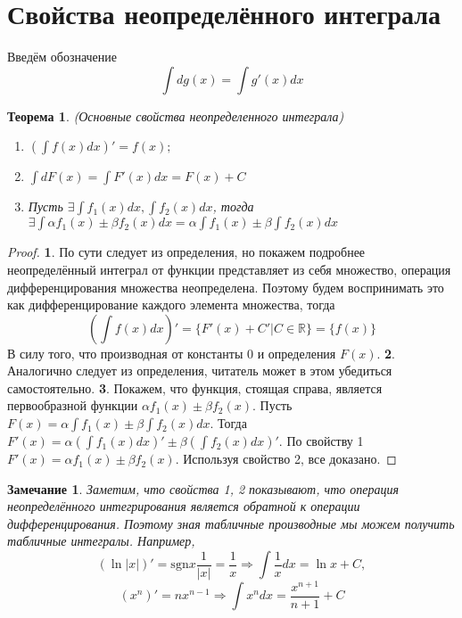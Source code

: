 \documentclass{book} %
\newtheorem{theorem}{Теорема}[chapter] %
\newtheorem{notabene}{Замечание}[chapter]
\theoremstyle{definition}
\theoremstyle{remark}
\begin{document}
	\section{Свойства неопределённого интеграла}
		Введём обозначение
		$$
		\int d g(x) = \int g'(x) dx
		$$
		\begin{theorem}
			(Основные свойства неопределенного интеграла)\newline
			\begin{enumerate}
				\item $\left(\int f(x) dx\right)' = f(x);$
				\item $\int d F(x) = \int F'(x) dx = F(x) + C$
				\item Пусть $\exists \int f_1(x) dx, \int f_2(x) dx$, тогда  $\exists \int \alpha f_1(x) \pm \beta f_2(x) dx = \alpha \int f_1(x) \pm \beta \int f_2(x) dx$
			\end{enumerate}
		\end{theorem}
		\begin{proof}
			\textbf{1}. По сути следует из определения, но покажем подробнее
			неопределённый интеграл от функции представляет из себя множество, операция дифференцирования множества неопределена. Поэтому будем воспринимать это как дифференцирование каждого элемента множества, тогда 
			$$\left(\int f(x) dx \right)' = \{F'(x) + C' \vert C \in \mathbb{R}\} = \{f(x) \}$$
			В силу того, что производная от константы 0 и определения $F(x)$.\newline
			\textbf{2}. Аналогично следует из определения, читатель может в этом убедиться самостоятельно.\newline
			\textbf{3}. Покажем, что функция, стоящая справа, является первообразной функции $\alpha f_1(x) \pm \beta f_2(x)$.\newline
			Пусть $F(x) = \alpha \int f_1(x) \pm \beta \int f_2(x) dx$. Тогда $F'(x) = \alpha \left(\int f_1(x) dx\right)' \pm \beta \left(\int f_2(x) dx\right)'$. По свойству 1 $F'(x) = \alpha f_1(x) \pm \beta f_2(x)$. Используя свойство 2, все доказано.
		\end{proof}
		\begin{notabene}
			Заметим, что свойства 1, 2 показывают, что операция неопределённого интегрирования является обратной к операции дифференцирования. Поэтому зная табличные производные мы можем получить табличные интегралы. Например, 
			$$
				\left(\ln{|x|}\right)' = \mathrm{sgn}x\dfrac{1}{|x|} = \dfrac{1}{x} \Rightarrow \int \dfrac{1}{x} dx = \ln{x} + C,
			$$
			$$
				\left(x^n\right)' = n x^{n-1} \Rightarrow \int x^n dx = \dfrac{x^{n+1}}{n+1} + C
			$$
		\end{notabene}
\end{document}

